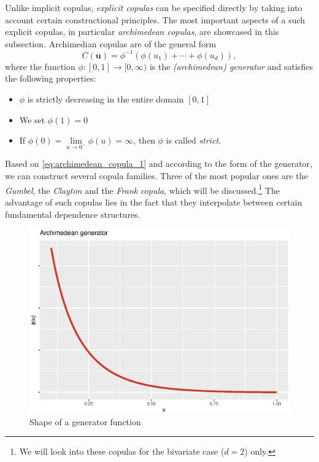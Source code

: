 
Unlike implicit copulas, \textit{explicit copulas} can be specified directly by taking into account certain constructional principles. The most important aspects of a such explicit copulas, in particular \textit{archimedean copulas}, are showcased in this subsection. Archimedian copulas are of the general form
\begin{equation}C(\boldsymbol{u})=\phi^{-1}\left(\phi\left(u_{1}\right)+\cdots+\phi\left(u_{d}\right)\right),
\label{eq:archimedean_copula_1}
\end{equation}
where the function $\phi:[0,1] \rightarrow [0, \infty)$ is the \textit{(archimedean) generator} and satisfies the following properties:
\begin{itemize}
\item $\phi$ is strictly decreasing in the entire domain $[0, 1]$
\item We set $\phi (1) = 0$
\item If  $\phi(0)=\lim \limits _{u \rightarrow 0^{-}} \phi(u)= \infty$, then $\phi$ is called \textit{strict}.
\end{itemize}




Based on \autoref{eq:archimedean_copula_1} and according to the form of the generator, we can construct several copula families. Three of the most popular ones are the \textit{Gumbel}, the \textit{Clayton} and the \textit{Frank} \textit{copula}, which will be discussed.\footnote{We will look into these copulas for the bivariate case ($d=2$) only.} The advantage of such copulas lies in the fact that they interpolate between certain fundamental dependence structures.\\

\begin{figure}[H]
\centering
  \includegraphics[width=.5\linewidth]{figures/archimedean_generator.eps}
  \caption{Shape of a generator function}
  \label{fig:archimedean_generator}
\end{figure}

